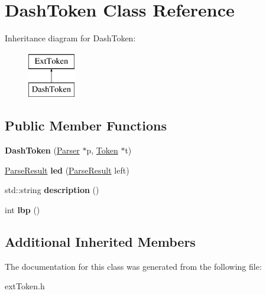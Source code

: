 \hypertarget{classDashToken}{\section{Dash\-Token Class Reference}
\label{classDashToken}
}
Inheritance diagram for Dash\-Token\-:\begin{figure}[H]
\begin{center}
\leavevmode
\includegraphics[height=2.000000cm]{classDashToken}
\end{center}
\end{figure}
\subsection*{Public Member Functions}
\begin{DoxyCompactItemize}
\item 
\hypertarget{classDashToken_a9570d66563405c728e679b63a44e53e2}{{\bfseries Dash\-Token} (\hyperlink{classParser}{Parser} $\ast$p, \hyperlink{classToken}{Token} $\ast$t)}\label{classDashToken_a9570d66563405c728e679b63a44e53e2}

\item 
\hypertarget{classDashToken_a703ca6afcd05ac4688c66b82e177bdbc}{\hyperlink{classParseResult}{Parse\-Result} {\bfseries led} (\hyperlink{classParseResult}{Parse\-Result} left)}\label{classDashToken_a703ca6afcd05ac4688c66b82e177bdbc}

\item 
\hypertarget{classDashToken_a02d79abb30dcab20081edb8e969885d2}{std\-::string {\bfseries description} ()}\label{classDashToken_a02d79abb30dcab20081edb8e969885d2}

\item 
\hypertarget{classDashToken_a1cf877584a85c06e884a182744e92b39}{int {\bfseries lbp} ()}\label{classDashToken_a1cf877584a85c06e884a182744e92b39}

\end{DoxyCompactItemize}
\subsection*{Additional Inherited Members}


The documentation for this class was generated from the following file\-:\begin{DoxyCompactItemize}
\item 
ext\-Token.\-h\end{DoxyCompactItemize}
